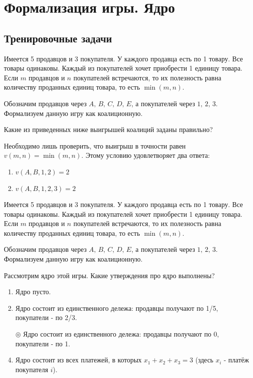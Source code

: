 	\section{Формализация игры. Ядро}
	
	\subsection{Тренировочные задачи}
	
	\task
	Имеется 5 продавцов и 3 покупателя. У каждого продавца есть по 1 товару. Все товары одинаковы. Каждый из покупателей хочет приобрести 1 единицу товара. Если $m$ продавцов и $n$ покупателей встречаются, то их полезность равна количеству проданных единиц товара, то есть $\min (m, n)$.
	
	Обозначим продавцов через $A,\,B,\,C,\,D,\,E$, а покупателей через $1,\,2,\,3$. Формализуем данную игру как коалиционную.
	
	Какие из приведенных ниже выигрышей коалиций заданы правильно?
	
	\solution
	Необходимо лишь проверить, что выигрыш в точности равен $v(m, n) = \min(m, n)$. Этому условию удовлетворяет два ответа:
	\begin{enumerate}[label=-]
		\item $v(A, B, 1, 2) = 2$
		\item $v(A, B, 1, 2, 3) = 2$
	\end{enumerate}
		
	\task
	Имеется 5 продавцов и 3 покупателя. У каждого продавца есть по 1 товару. Все товары одинаковы. Каждый из покупателей хочет приобрести 1 единицу товара. Если $m$ продавцов и $n$ покупателей встречаются, то их полезность равна количеству проданных единиц товара, то есть $\min(m,n)$.
	
	Обозначим продавцов через $A,\,B,\,C,\,D,\,E$, а покупателей через $1,\,2,\,3$. Формализуем данную игру как коалиционную.
	
	Рассмотрим ядро этой игры. Какие утверждения про ядро выполнены?
	
	\begin{enumerate}[label=$\circ$]
		\item Ядро пусто.
		\item Ядро состоит из единственного дележа: продавцы получают по 1/5, покупатели - по 2/3.
		\item[$\circledcirc$] Ядро состоит из единственного дележа: продавцы получают по 0, покупатели - по 1.
		\item Ядро состоит из всех платежей, в которых $x_1+x_2+x_3 = 3$ (здесь $x_i$ - платёж покупателя $i$).
	\end{enumerate}

